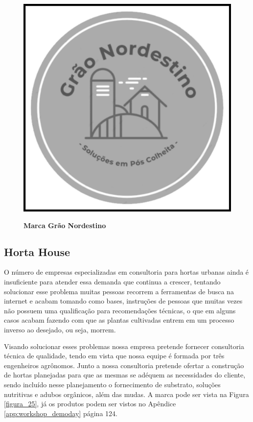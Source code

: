 \begin{figure}[H]
\centering
\caption{\textbf{Marca Grão Nordestino}}
\includegraphics[scale=0.07]{Imagens/graonordestino.png}
\label{figura_21}
\end{figure}



\subsection{Horta House}


O número de empresas especializadas em consultoria para hortas urbanas ainda é insuficiente para atender essa demanda que continua a crescer, tentando solucionar esse problema muitas pessoas recorrem a ferramentas de busca na internet e acabam tomando como bases, instruções de pessoas que muitas vezes não possuem uma qualificação para recomendações técnicas, o que em alguns casos acabam fazendo com que as plantas cultivadas entrem em um processo inverso ao desejado, ou seja, morrem.


Visando solucionar esses problemas nossa empresa pretende fornecer consultoria técnica de qualidade, tendo em vista que nossa equipe é formada por três engenheiros agrônomos. Junto a nossa consultoria pretende ofertar a construção de hortas planejadas para que as mesmas se adéquem as necessidades do cliente, sendo incluído nesse planejamento o fornecimento de substrato, soluções nutritivas e adubos orgânicos, além das mudas. A marca pode ser vista na Figura \ref{figura_25}, já os produtos podem ser vistos no Apêndice \ref{app:workshop_demoday} página 124.


